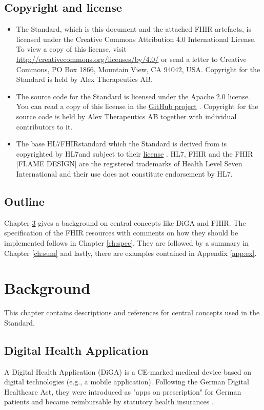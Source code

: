 \documentclass{report}
\newcommand{\fhir}{FHIR\textsuperscript{\textregistered}}
\newcommand{\hl}{HL7\textsuperscript{\textregistered}}
\begin{document}
\section{Copyright and license}

\begin{itemize}
    \item The Standard, which is this document and the attached FHIR artefacts, is licensed under the Creative Commons Attribution 4.0 International License. 
To view a copy of this license, visit \url{http://creativecommons.org/licenses/by/4.0/} or send a letter to Creative Commons, PO Box 1866, Mountain View, CA 94042, USA.
Copyright for the Standard is held by Alex Therapeutics AB. 
    \item The source code for the Standard is licensed under the Apache 2.0 license. 
You can read a copy of this license in the \href{https://github.com/alex-therapeutics/diga-nicotine-usage-fhir/blob/main/LICENSE}{GitHub project} \cite{github}.
Copyright for the source code is held by Alex Therapeutics AB together with individual contributors to it.
    \item The base \hl \fhir standard which the Standard is derived from is copyrighted by \hl and subject to their \href{http://hl7.org/fhir/license.html}{license} \cite{fhirlic}.
HL7, FHIR and the FHIR [FLAME DESIGN] are the registered trademarks of Health Level Seven International and their use does not constitute endorsement by HL7.
\end{itemize}

\section{Outline}
Chapter \ref{ch:bg} gives a background on central concepts like DiGA and FHIR. The specification of the FHIR resources with comments on how they should be implemented follows in Chapter \ref{ch:spec}.
They are followed by a summary in Chapter \ref{ch:sum} and lastly, there are examples contained in Appendix \ref{app:ex}.


\chapter{Background}
\label{ch:bg}

This chapter contains descriptions and references for central concepts used in the Standard.

\section{Digital Health Application}
A Digital Health Application (DiGA) is a CE-marked medical device based on digital technologies (e.g., a mobile application). Following the German Digital Healthcare Act, they were introduced as "apps on prescription" for German patients and became reimbursable by statutory health insurances \cite{diga}.
\end{document}
